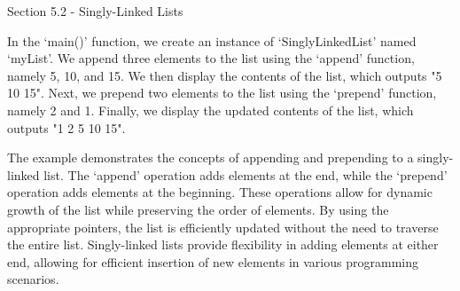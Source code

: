 \begin{notes}{Section 5.2 - Singly-Linked Lists}
\begin{highlight}
        In the `main()' function, we create an instance of `SinglyLinkedList' named `myList'. We append three elements to the list using the `append' function, namely 5, 10, and 15. We then display the contents of the list, which outputs 
        "5 10 15". Next, we prepend two elements to the list using the `prepend' function, namely 2 and 1. Finally, we display the updated contents of the list, which outputs "1 2 5 10 15".
    
        The example demonstrates the concepts of appending and prepending to a singly-linked list. The `append' operation adds elements at the end, while the `prepend' operation adds elements at the beginning. These operations allow for dynamic 
        growth of the list while preserving the order of elements. By using the appropriate pointers, the list is efficiently updated without the need to traverse the entire list. Singly-linked lists provide flexibility in adding elements at 
        either end, allowing for efficient insertion of new elements in various programming scenarios.
    \end{highlight}
\end{notes}

